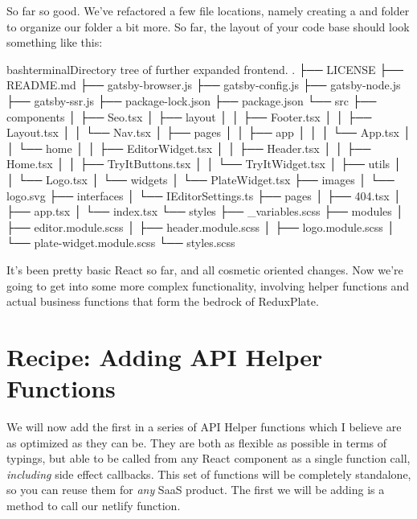 \documentclass[paper=6in:9in,pagesize=pdftex,headinclude=on,footinclude=on,12pt,twoside]{scrbook}
\begin{document}
So far so good. We've refactored a few file locations, namely creating a  and  folder to organize our  folder a bit more. So far, the layout of your code base should look something like this:

\begin{codeInput}{bash}{terminal}{Directory tree of further expanded frontend.}
.
├── LICENSE
├── README.md
├── gatsby-browser.js
├── gatsby-config.js
├── gatsby-node.js
├── gatsby-ssr.js
├── package-lock.json
├── package.json
└── src
    ├── components
    │   ├── Seo.tsx
    │   ├── layout
    │   │   ├── Footer.tsx
    │   │   ├── Layout.tsx
    │   │   └── Nav.tsx
    │   ├── pages
    │   │   ├── app
    │   │   │   └── App.tsx
    │   │   └── home
    │   │       ├── EditorWidget.tsx
    │   │       ├── Header.tsx
    │   │       ├── Home.tsx
    │   │       ├── TryItButtons.tsx
    │   │       └── TryItWidget.tsx
    │   ├── utils
    │   │   └── Logo.tsx
    │   └── widgets
    │       └── PlateWidget.tsx
    ├── images
    │   └── logo.svg
    ├── interfaces
    │   └── IEditorSettings.ts
    ├── pages
    │   ├── 404.tsx
    │   ├── app.tsx
    │   └── index.tsx
    └── styles
        ├── _variables.scss
        ├── modules
        │   ├── editor.module.scss
        │   ├── header.module.scss
        │   ├── logo.module.scss
        │   └── plate-widget.module.scss
        └── styles.scss
\end{codeInput}

It's been pretty basic React so far, and all cosmetic oriented changes. Now we're going to get into some more complex functionality, involving helper functions and actual business functions that form the bedrock of ReduxPlate.

\section{Recipe: Adding API Helper Functions}

We will now add the first in a series of API Helper functions which I believe are as optimized as they can be. They are both as flexible as possible in terms of typings, but able to be called from any React component as a single function call, \textit{including} side effect callbacks. This set of functions will be completely standalone, so you can reuse them for \textit{any} SaaS product. The first we will be adding is a  method to call our netlify function.
\end{document}
